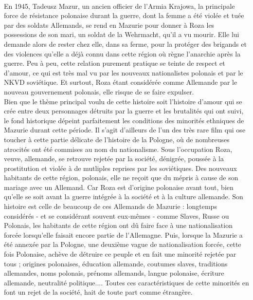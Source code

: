 \documentclass[12pt]{amsart}
\begin{document}
\paragraph{}
En 1945, Tadeusz Mazur, un ancien officier de l'Armia Krajowa, la principale force de résistance polonaise durant la guerre, dont la femme a été violée et tuée par des soldats Allemands, se rend en Mazurie pour donner à Roza les possessions de son mari, un soldat de la Wehrmacht, qu'il a vu mourir. Elle lui demande alors de rester chez elle, dans sa ferme, pour la protéger des brigands et des violences qu'elle a déjà connu dans cette région où règne l'anarchie après la guerre. Peu à peu, cette relation purement pratique se teinte de respect et d'amour, ce qui est très mal vu par les nouveaux nationalistes polonais et par le NKVD soviétique. Et surtout, Roza étant considérée comme Allemande par le nouveau gouvernement polonais, elle risque de se faire expulser. \\
Bien que le thème principal voulu de cette histoire soit l'histoire d'amour qui se crée entre deux personnages détruits par la guerre et les brutalités qui ont suivi, le fond historique dépeint parfaitement les conditions des minorités ethniques de Mazurie durant cette période. Il s'agit d'ailleurs de l'un des très rare film qui ose toucher à cette partie délicate de l'histoire de la Pologne, où de nombreuses atrocités ont été commises au nom du nationalisme. Sous l'occupation Roza, veuve, allemande, se retrouve rejetée par la société, dénigrée, poussée à la prostitution et violée à de mutliples reprises par les soviétiques. Des nouveaux habitants de cette région, polonais, elle ne reçoit que du mépris à cause de son mariage avec un Allemand. Car Roza est d'origine polonaise avant tout, bien qu'elle se soit avant la guerre intégrée à la société et à la culture allemande. Son histoire est celle de beaucoup de ces Allemands de Mazurie : longtemps considérés - et se considérant souvent eux-mêmes - comme Slaves, Russe ou Polonais, les habitants de cette région ont dû faire face à une nationalisation forcée lorsqu'elle faisait encore partie de l'Allemagne. Puis, lorsque la Mazurie a été annexée par la Pologne, une deuxième vague de nationalisation forcée, cette fois Polonaise, achève de détruire ce peuple et en fait une minorité rejetée par tous ; origines polonaises, éducation allemande, coutumes slaves, traditions allemandes, noms polonais, prénoms allemands, langue polonaise, écriture allemande, neutralité politique.... Toutes ces caractéristiques de cette minorités en font un rejet de la société, hait de toute part comme étrangère. 
\clearpage
\end{document}
